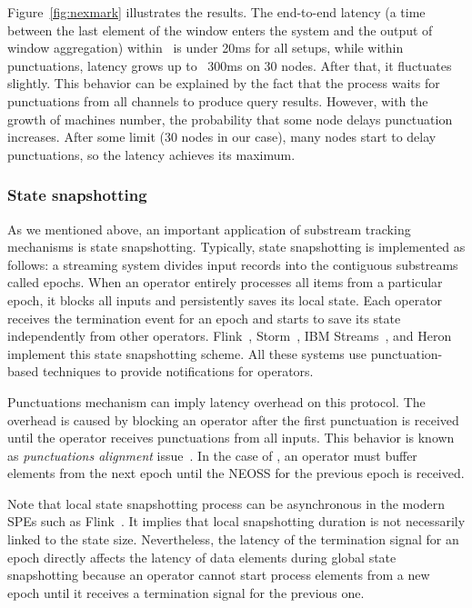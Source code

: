 
Figure~\ref{fig:nexmark} illustrates the results. The end-to-end latency (a time between the last element of the window enters the system and the output of window aggregation) within \tracker\ is under 20ms for all setups, while within punctuations, latency grows up to ~300ms on 30 nodes. After that, it fluctuates slightly. This behavior can be explained by the fact that the process waits for punctuations from all channels to produce query results. However, with the growth of machines number, the probability that some node delays punctuation increases. After some limit (30 nodes in our case), many nodes start to delay punctuations, so the latency achieves its maximum. 

\subsubsection{State snapshotting}
As we mentioned above, an important application of substream tracking mechanisms is state snapshotting. Typically, state snapshotting is implemented as follows: a streaming system divides input records into the contiguous substreams called epochs. When an operator entirely processes all items from a particular epoch, it blocks all inputs and persistently saves its local state. Each operator receives the termination event for an epoch and starts to save its state independently from other operators. Flink~\cite{Carbone:2017:SMA:3137765.3137777}, Storm~\cite{apache:storm:state}, IBM Streams~\cite{jacques2016consistent}, and Heron~\cite{Kulkarni:2015:THS:2723372.2742788} implement this state snapshotting scheme. All these systems use punctuation-based techniques to provide notifications for operators.

Punctuations mechanism can imply latency overhead on this protocol. The overhead is caused by blocking an operator after the first punctuation is received until the operator receives punctuations from all inputs. This behavior is known as {\em punctuations alignment} issue~\cite{Carbone:2017:SMA:3137765.3137777}. In the case of \tracker , an operator must buffer elements from the next epoch until the NEOSS for the previous epoch is received.

Note that local state snapshotting process can be asynchronous in the modern SPEs such as Flink~\cite{Carbone:2017:SMA:3137765.3137777}. It implies that local snapshotting duration is not necessarily linked to the state size. Nevertheless, the latency of the termination signal for an epoch directly affects the latency of data elements during global state snapshotting because an operator cannot start process elements from a new epoch until it receives a termination signal for the previous one.

